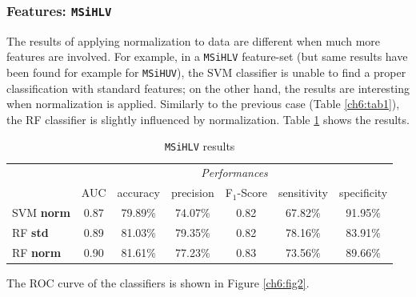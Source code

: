 \vspace{1.5cm}

\subsubsection{Features: \texttt{MSiHLV}}

The results of applying normalization to data are different when much more features are involved. For example, in a \texttt{MSiHLV} feature-set (but same results 
have been found for example for \texttt{MSiHUV}), the \Gls{SVM} classifier is unable to find a proper classification with standard features; on the other hand, 
the results are interesting when normalization is applied. Similarly to the previous case (Table \ref{ch6:tab1}), the \Gls{RF} classifier is slightly influenced by
normalization. Table \ref{ch6:tab2} shows the results.




\begin{table}[!ht]
\small
 \centering
 \begin{tabular}{lcccccc}
  \toprule
  & \multicolumn{6}{c}{\textit{Performances}} \\
  \cmidrule(lr){2-7}
  & AUC  & accuracy & precision & F$_1$-Score & sensitivity & specificity \\
  \midrule
  SVM \textbf{norm}  & 0.87 & 79.89\%  & 74.07\%   & 0.82        & 67.82\%     & 91.95\%  \\
  RF \textbf{std}    & 0.89 & 81.03\%  & 79.35\%   & 0.82        & 78.16\%     & 83.91\%  \\
  RF \textbf{norm}   & 0.90 & 81.61\%  & 77.23\%   & 0.83        & 73.56\%     & 89.66\%  \\
  \bottomrule
 \end{tabular}
 \caption{\texttt{MSiHLV} results}
 \label{ch6:tab2}
\end{table}


\noindent The \Gls{ROC} curve of the classifiers is shown in Figure \ref{ch6:fig2}.

